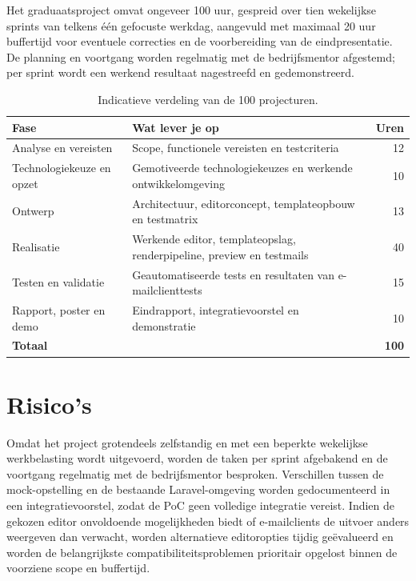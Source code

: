Het graduaatsproject omvat ongeveer 100 uur, gespreid over tien wekelijkse
sprints van telkens één gefocuste werkdag, aangevuld met maximaal 20 uur
buffertijd voor eventuele correcties en de voorbereiding van de eindpresentatie.
De planning en voortgang worden regelmatig met de bedrijfsmentor afgestemd;
per sprint wordt een werkend resultaat nagestreefd en gedemonstreerd.

\begin{table}[htbp]
  \centering
  \begin{tabular}{p{}p{}r}
    \toprule
    \textbf{Fase} & \textbf{Wat lever je op} & \textbf{Uren} \\
    \midrule
    Analyse en vereisten
      & Scope, functionele vereisten en testcriteria
      & 12 \\
    Technologiekeuze en opzet
      & Gemotiveerde technologiekeuzes en werkende ontwikkelomgeving
      & 10 \\
    Ontwerp
      & Architectuur, editorconcept, templateopbouw en testmatrix
      & 13 \\
    Realisatie
      & Werkende editor, templateopslag, renderpipeline, preview en testmails
      & 40 \\
    Testen en validatie
      & Geautomatiseerde tests en resultaten van e-mailclienttests
      & 15 \\
    Rapport, poster en demo
      & Eindrapport, integratievoorstel en demonstratie
      & 10 \\
    \midrule
    \textbf{Totaal} & & \textbf{100} \\
    \bottomrule
  \end{tabular}
  \caption[Planning en werkbelasting]{\label{tab:vst-planning}%
    Indicatieve verdeling van de 100 projecturen.}
\end{table}


\section{Risico's}%
\label{vst:risicos}

%

Omdat het project grotendeels zelfstandig en met een beperkte wekelijkse
werkbelasting wordt uitgevoerd, worden de taken per sprint afgebakend en de
voortgang regelmatig met de bedrijfsmentor besproken. Verschillen tussen de
mock-opstelling en de bestaande Laravel-omgeving worden gedocumenteerd in een
integratievoorstel, zodat de PoC geen volledige integratie vereist. Indien de
gekozen editor onvoldoende mogelijkheden biedt of e-mailclients de uitvoer
anders weergeven dan verwacht, worden alternatieve editoropties tijdig
geëvalueerd en worden de belangrijkste compatibiliteitsproblemen prioritair
opgelost binnen de voorziene scope en buffertijd.
